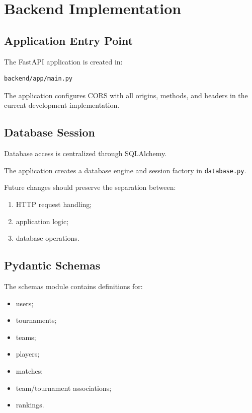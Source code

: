 \documentclass[12pt,a4paper]{article}
\begin{document}
\section{Backend Implementation}

\subsection{Application Entry Point}

The FastAPI application is created in:

\begin{lstlisting}
backend/app/main.py
\end{lstlisting}

The application configures CORS with all origins, methods, and headers
in the current development implementation.

\subsection{Database Session}

Database access is centralized through SQLAlchemy.

The application creates a database engine and session factory in
\texttt{database.py}.

Future changes should preserve the separation between:

\begin{enumerate}
    \item HTTP request handling;
    \item application logic;
    \item database operations.
\end{enumerate}

\subsection{Pydantic Schemas}

The schemas module contains definitions for:

\begin{itemize}
    \item users;
    \item tournaments;
    \item teams;
    \item players;
    \item matches;
    \item team/tournament associations;
    \item rankings.
\end{itemize}
\end{document}
